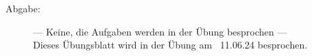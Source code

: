 \documentclass[a4paper,11pt]{scrartcl}
\begin{document}

\begin{description}
\item[Abgabe:] --- Keine, die Aufgaben werden in der Übung besprochen ---\\
Dieses Übungsblatt wird in der Übung am ~11.06.24 besprochen.



\end{description}
\end{document}

